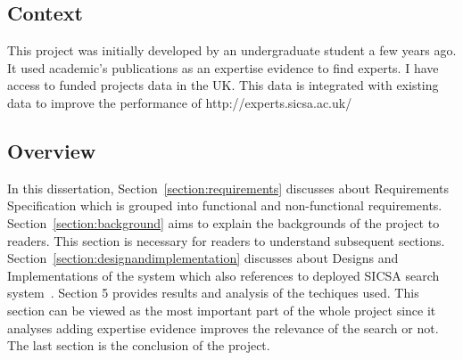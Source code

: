 \subsection{Context}
This project was initially developed by an undergraduate student a few years ago. It used academic's publications as an expertise evidence to find experts.
I have access to funded projects data in the UK. This data is integrated with existing data to improve the performance of http://experts.sicsa.ac.uk/ ~\cite{sicsasearch}

\subsection{Overview}
In this dissertation, Section~\ref{section:requirements} discusses about Requirements Specification which is grouped into functional and non-functional requirements. 
Section~\ref{section:background} aims to explain the backgrounds of the project to readers. This section is necessary for readers to understand subsequent sections. 
Section~\ref{section:designandimplementation} discusses about Designs and Implementations of the system which also references to deployed SICSA search system~\cite{sicsasearch}. 
Section 5 provides results and analysis of the techiques used. This section can be viewed as the most important part of the whole project since it 
analyses adding expertise evidence improves the relevance of the search or not. The last section is the conclusion of the project.
